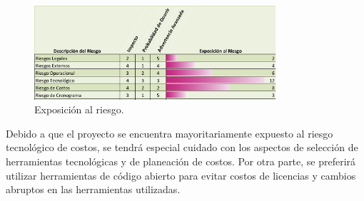 \begin{figure}[H]
  \centering
  \includegraphics[width=0.8\textwidth]{imagenes/03-analisis/analisis-riesgos/exposicion-riesgos.png}
  \caption{Exposición al riesgo.}
  \label{fig:exposicion_riesgo}
\end{figure}

Debido a que el proyecto se encuentra mayoritariamente expuesto al riesgo
tecnológico de costos, se tendrá especial cuidado con los aspectos de selección
de herramientas tecnológicas y de planeación de costos. Por otra parte, se
preferirá utilizar herramientas de código abierto para evitar costos de licencias
y cambios abruptos en las herramientas utilizadas.
